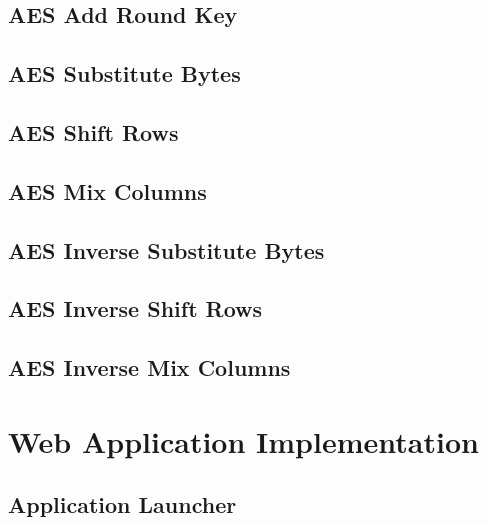 \subsection{AES Add Round Key}


\subsection{AES Substitute Bytes}


\subsection{AES Shift Rows}


\subsection{AES Mix Columns}


\subsection{AES Inverse Substitute Bytes}


\subsection{AES Inverse Shift Rows}


\subsection{AES Inverse Mix Columns}


\section{Web Application Implementation}

\subsection{Application Launcher}



